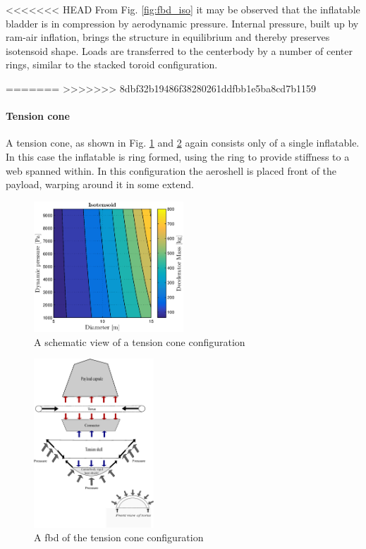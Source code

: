 <<<<<<< HEAD
From Fig. \ref{fig:fbd_iso} it may be observed that the inflatable bladder is in compression by aerodynamic pressure. Internal pressure, built up by ram-air inflation, brings the structure in equilibrium and thereby preserves isotensoid shape. Loads are transferred to the centerbody by a number of center rings, similar to the stacked toroid configuration.

=======
>>>>>>> 8dbf32b19486f38280261ddfbb1e5ba8cd7b1159
\paragraph{Tension cone}

A tension cone, as shown in Fig. \ref{fig:conc_tension} and \ref{fig:fbd_tension} again consists only of a single inflatable. In this case the inflatable is ring formed, using the ring to provide stiffness to a web spanned within. In this configuration the aeroshell is placed front of the payload, warping around it in some extend.

\begin{figure}[H]
\centering
\includegraphics[width = 0.5\textwidth]{Figure/ISO_comp.eps}
\caption{A schematic view of a tension cone configuration}
\label{fig:conc_tension}
\end{figure}

\begin{figure}[H]
\centering
\includegraphics[width = 0.4\textwidth]{Figure/FBD_tensioncone.eps}
\caption{A \gls{fbd} of the tension cone configuration}
\label{fig:fbd_tension}
\end{figure}

